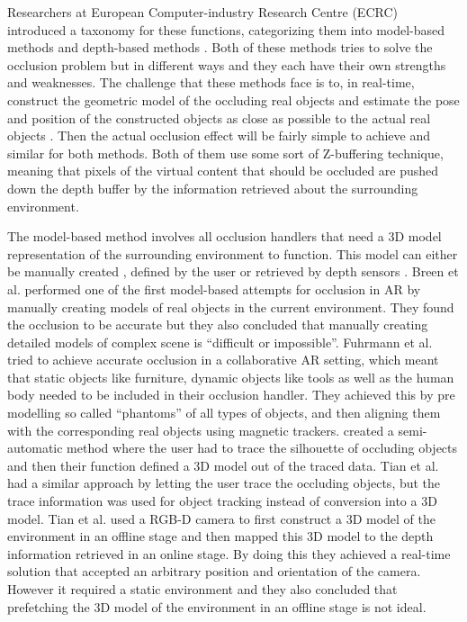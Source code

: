 Researchers at European Computer-industry Research Centre (ECRC) introduced a taxonomy for these functions, categorizing them into model-based methods and depth-based methods \cite{breen1996interactive}. Both of these methods tries to solve the occlusion problem but in different ways and they each have their own strengths and weaknesses. The challenge that these methods face is to, in real-time, construct the geometric model of the occluding real objects and estimate the pose and position of the constructed objects as close as possible to the actual real objects \cite{fortin2006handling}. Then the actual occlusion effect will be fairly simple to achieve and similar for both methods. Both of them use some sort of Z-buffering technique, meaning that pixels of the virtual content that should be occluded are pushed down the depth buffer by the information retrieved about the surrounding environment.

The model-based method involves all occlusion handlers that need a 3D model representation of the surrounding environment to function. This model can either be manually created \cite{breen1996interactive, fuhrmann1999occlusion}, defined by the user \cite{ong1998resolving, lepetit2000semi, tian2010real} or retrieved by depth sensors \cite{tian2015handling}. Breen et al. \cite{breen1996interactive} performed one of the first model-based attempts for occlusion in AR by manually creating models of real objects in the current environment. They found the occlusion to be accurate but they also concluded that manually creating detailed models of complex scene is ``difficult or impossible''. Fuhrmann et al. \cite{fuhrmann1999occlusion} tried to achieve accurate occlusion in a collaborative AR setting, which meant that static objects like furniture, dynamic objects like tools as well as the human body needed to be included in their occlusion handler. They achieved this by pre modelling so called ``phantoms'' of all types of objects, and then aligning them with the corresponding real objects using magnetic trackers. \cite{ong1998resolving, lepetit2000semi} created a semi-automatic method where the user had to trace the silhouette of occluding objects and then their function defined a 3D model out of the traced data.  Tian et al. \cite{tian2010real} had a similar approach by letting the user trace the occluding objects, but the trace information was used for object tracking instead of conversion into a 3D model. Tian et al. \cite{tian2015handling} used a RGB-D camera to first construct a 3D model of the environment in an offline stage and then mapped this 3D model to the depth information retrieved in an online stage. By doing this they achieved a real-time solution that accepted an arbitrary position and orientation of the camera. However it required a static environment and they also concluded that prefetching the 3D model of the environment in an offline stage is not ideal. 

